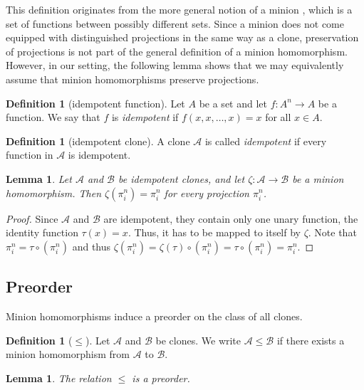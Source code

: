 \documentclass{amsart}
\numberwithin{equation}{section}
\theoremstyle{plain}
\newtheorem{lemma}[theorem]{Lemma}
\theoremstyle{definition}
\newtheorem{definition}[theorem]{Definition}
\def\set#1{#1}
\def\clone#1{\mathcal{#1}}
\begin{document}
This definition originates from the more general notion of a minion \cite{approach}, which is a set of functions between possibly different sets. Since a minion does not come equipped with distinguished projections in the same way as a clone, preservation of projections is not part of the general definition of a minion homomorphism. However, in our setting, the following lemma shows that we may equivalently assume that minion homomorphisms preserve projections.

\begin{definition}[idempotent function]
Let $\set{A}$ be a set and let $f\colon \set{A}^n\to \set{A}$ be a function. We say that $f$ is {\em idempotent} if $f(x,x,\dots,x) = x$ for all $x\in\set{A}$.
\end{definition}

\begin{definition}[idempotent clone]
A clone $\clone{A}$ is called {\em idempotent} if every function in $ \clone{A}$ is idempotent.
\end{definition}


\begin{lemma}
\label{projtoproj}
Let $\clone{A}$ and $\clone{B}$ be idempotent clones, and let $\zeta:\clone{A}\to \clone{B}$ be a minion homomorphism. Then $\zeta(\pi_i^n) = \pi_i^n$ for every projection $\pi_i^n$.
\end{lemma}
\begin{proof}
Since $\clone{A}$ and $\clone{B}$ are idempotent, they contain only one unary function, the identity function $\tau(x) = x$. Thus, it has to be mapped to itself by $\zeta$. Note that $\pi_i^n = \tau\circ(\pi_i^n)$ and thus $\zeta(\pi_i^n) = \zeta(\tau)\circ(\pi_i^n) = \tau\circ(\pi_i^n) = \pi_i^n$. 
\end{proof}

\subsection{Preorder}

Minion homomorphisms induce a preorder on the class of all clones.

\begin{definition}[$\leq$]
Let $\clone{A}$ and $\clone{B}$ be clones. We write $\clone{A}\leq \clone{B}$ if there exists a minion homomorphism from $\clone{A}$ to $ \clone{B}$.
\end{definition}

\begin{lemma}
The relation $\leq$ is a preorder.
\end{lemma}
\end{document}

